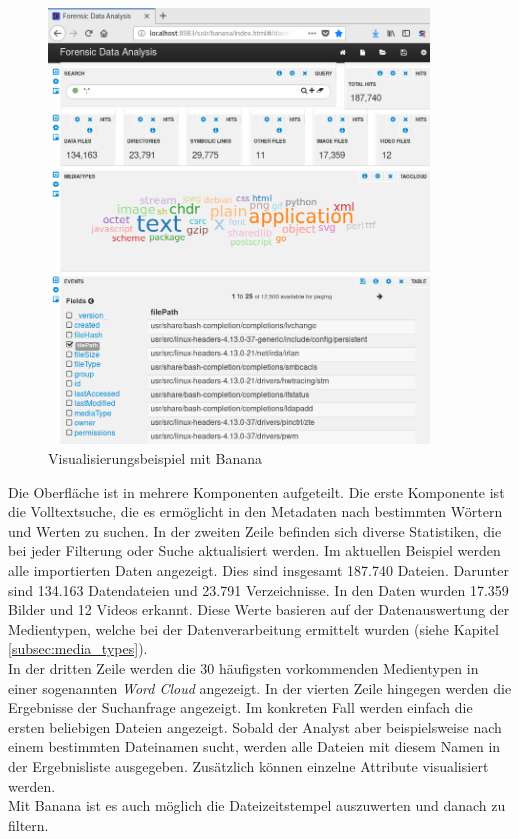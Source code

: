 \begin{figure}[ht]
  \centering
  \includegraphics[width=0.9\textwidth]{./resource/forensicDataAnalysisUI.png}
  \caption{Visualisierungsbeispiel mit Banana}
  \label{fig:banana_visualization}
\end{figure}

\noindent
Die Oberfläche ist in mehrere Komponenten aufgeteilt. Die erste Komponente ist die Volltextsuche, die es ermöglicht in den Metadaten nach bestimmten Wörtern und Werten zu suchen. In der zweiten Zeile befinden sich diverse Statistiken, die bei jeder Filterung oder Suche aktualisiert werden. 
Im aktuellen Beispiel werden alle importierten Daten angezeigt. Dies sind insgesamt 187.740 Dateien. Darunter sind 134.163 Datendateien und 23.791 Verzeichnisse. In den Daten wurden 17.359 Bilder und 12 Videos erkannt. Diese Werte basieren auf der Datenauswertung der Medientypen, welche bei der Datenverarbeitung ermittelt wurden (siehe Kapitel \ref{subsec:media_types}).\\
In der dritten Zeile werden die 30 häufigsten vorkommenden Medientypen in einer sogenannten \textit{Word Cloud} angezeigt. In der vierten Zeile hingegen werden die Ergebnisse der Suchanfrage angezeigt. Im konkreten Fall werden einfach die ersten beliebigen Dateien angezeigt. 
Sobald der Analyst aber beispielsweise nach einem bestimmten Dateinamen sucht, werden alle Dateien mit diesem Namen in der Ergebnisliste ausgegeben. Zusätzlich können einzelne Attribute visualisiert werden.\\
Mit Banana ist es auch möglich die Dateizeitstempel auszuwerten und danach zu filtern.\\

